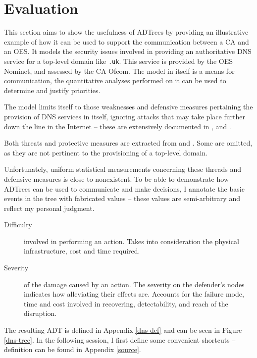 \documentclass{scrreprt}
\begin{document}
\chapter{Evaluation}
\label{evaluation}

This section aims to show the usefulness of ADTrees by providing an illustrative
example of how it can be used to support the communication between a CA and an
OES. It models the security issues involved in providing an authoritative DNS
service for a top-level domain like \texttt{.uk}. This service is provided by
the OES Nominet, and assessed by the CA Ofcom. The model in itself is a means
for communication, the quantitative analyses performed on it can be used to
determine and justify priorities.

The model limits itself to those weaknesses and defensive measures pertaining
the provision of DNS services in itself, ignoring attacks that may take place
further down the line in the Internet -- these are extensively documented in
\cite{weaknesses-dns}, \cite{rfc3833} and \cite{dns-bind-sec}.

Both threats and protective measures are extracted from \cite[sections 3, 5, 7,
and 10]{secdns} and \cite{dns-threat-analysis}. Some are omitted, as they are
not pertinent to the provisioning of a top-level domain. 

Unfortunately, uniform statistical measurements concerning these threads and
defensive measures is close to nonexistent. To be able to demonstrate how
ADTrees can be used to communicate and make decisions, I annotate the basic
events in the tree with fabricated values -- these values are semi-arbitrary and
reflect my personal judgment.

\begin{description}
    \item [Difficulty] involved in performing an action. Takes into
        consideration the physical infrastructure, cost and time required.
    \item [Severity] of the damage caused by an action. The severity on the
        defender's nodes indicates how alleviating their effects are. Accounts
        for the failure mode, time and cost involved in recovering,
        detectability, and reach of the disruption.
\end{description}

The resulting ADT is defined in Appendix \ref{dns-def} and can be seen in Figure
\ref{dns-tree}. In the following session, I first define some convenient
shortcuts -- definition can be found in Appendix \ref{source}.
\end{document}
